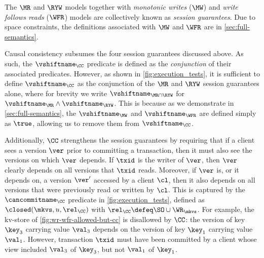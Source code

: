 The \(\MR\) and \(\RYW\) models together with \emph{monotonic writes} (\(\MW\)) and \emph{write follows reads} (\(\WFR\)) models  are collectively known as \emph{session guarantees}. 
Due to space constraints, the definitions associated with \(\MW\) and \(\WFR\) are in \cref{sec:full-semantics}. 



Causal consistency subsumes the  four session guarantees discussed above. 
As such, the \(\vshiftname_\CC\) predicate is defined as the \emph{conjunction} of their associated \vshiftname predicates.
However, as shown in  \cref{fig:execution_tests}, it is sufficient to define \(\vshiftname_\CC\)
as the conjunction of the \(\MR\) and \(\RYW\) session guarantees alone, where for brevity we 
write \(\vshiftname_{\MR \cap \RYW}\) for  \(\vshiftname_{\MR} \land \vshiftname_{\RYW}\).
This is because 
as we demonstrate in \cref{sec:full-semantics},
the \(\vshiftname_{\MW}\) and \(\vshiftname_{\WFR}\) are defined simply as \( \true \), allowing us to remove them from \(\vshiftname_{\CC}\).

Additionally, \(\CC\) strengthens the session guarantees by requiring that if a client sees a version \(\ver\) prior to committing a transaction, then it must also see the versions 
on which \(\ver\) depends.
If \(\txid\) is the writer of \(\ver\), then 
\(\ver\) clearly depends on all versions that \(\txid\) reads. 
Moreover, if \(\ver\) is, or it depends on, a version \(\ver'\) accessed by 
a client \(\cl\), then it also depends on all versions that were previously 
read or written by \(\cl\). 
This is captured by the \(\cancommitname_{\CC}\) predicate in \cref{fig:execution_tests}, 
defined as \(\closed(\mkvs, u, \rel_{\CC})\) with \(\rel_\CC \defeq \SO \cup \WR_{\mkvs}\).
For example, the kv-store of \cref{fig:wr-wfr-allowed-but-cc} 
is disallowed by \(\CC\): the version of key \(\key_3\) carrying value \(\val_3\) depends on 
the version of key \(\key_1\) carrying value \(\val_1\). 
However, transaction \(\txid\) must have been committed by a client
whose view included \(\val_3\) of \( \key_3\), but not \(\val_1\) of \( \key_1\).

